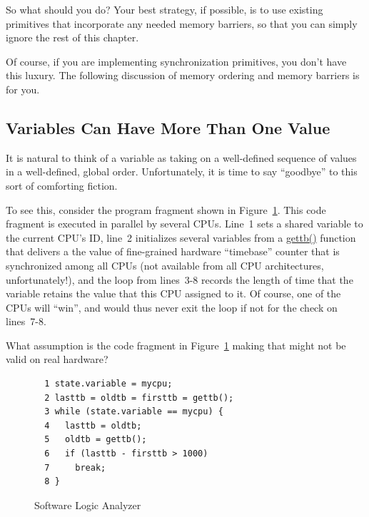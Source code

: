 So what should you do?
Your best strategy, if possible, is to use existing primitives that
incorporate any needed memory barriers, so that you can simply ignore
the rest of this chapter.

Of course, if you are implementing synchronization primitives,
you don't have this luxury.
The following discussion of memory ordering and memory barriers
is for you.

\subsection{Variables Can Have More Than One Value}
\label{sec:advsync:Variables Can Have More Than One Value}

It is natural to think of a variable as taking on a well-defined
sequence of values in a well-defined, global order.
Unfortunately, it is time to say ``goodbye'' to this sort of comforting
fiction.

To see this, consider the program fragment shown in
Figure~\ref{fig:advsync:Software Logic Analyzer}.
This code fragment is executed in parallel by several CPUs.
Line~1 sets a shared variable to the current CPU's ID, line~2
initializes several variables from a \url{gettb()} function that
delivers a the value of fine-grained hardware ``timebase'' counter that is
synchronized among all CPUs (not available from all CPU architectures,
unfortunately!), and the loop from lines~3-8 records the length of
time that the variable retains the value that this CPU assigned to it.
Of course, one of the CPUs will ``win'', and would thus never exit
the loop if not for the check on lines~7-8.

\QuickQuiz{}
	What assumption is the code fragment
	in Figure~\ref{fig:advsync:Software Logic Analyzer}
	making that might not be valid on real hardware?
 \QuickQuizEnd

\begin{figure}[htbp]
{ \centering
\begin{verbatim}
  1 state.variable = mycpu;
  2 lasttb = oldtb = firsttb = gettb();
  3 while (state.variable == mycpu) {
  4   lasttb = oldtb;
  5   oldtb = gettb();
  6   if (lasttb - firsttb > 1000)
  7     break;
  8 }
\end{verbatim}
}
\caption{Software Logic Analyzer}
\label{fig:advsync:Software Logic Analyzer}
\end{figure}

